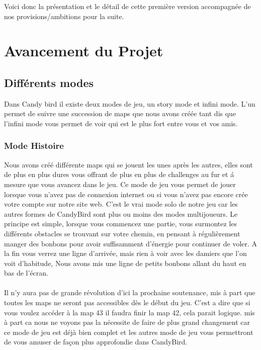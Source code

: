 \documentclass [11pt]{report}
\begin{document}
Voici donc la présentation et le détail de cette première version accompagnée de nos provisions/ambitions pour la suite.




\chapter{Avancement du Projet}
	\section{Différents modes}
	Dans Candy bird il existe deux modes de jeu, un story mode et infini mode. L'un permet de suivre une succession de maps que nous avons cr\'e\'ee tant dis que l'infini mode vous permet de voir qui est le plus fort entre vous et vos amis.
	
	\vspace{10mm}
	
		\subsection{Mode Histoire}	
		Nous avons créé différente maps qui se jouent les unes après les autres, elles sont de plus en plus dures vous  offrant de plus en plus de challenges au fur et \'a mesure que vous avancez dans le jeu. Ce mode de jeu vous permet de jouer lorsque vous n'avez pas de connexion internet ou si vous n'avez pas encore cr\'ee votre compte sur notre site web. C'est le vrai mode solo de notre jeu car les autres formes de CandyBird sont plus ou moins des modes multijoueurs. Le principe est simple, lorsque vous commencez une partie, vous surmontez les différents obstacles se trouvant sur votre chemin, en pensant \`a régulièrement manger des bonbons pour avoir suffisamment d'énergie pour continuer de voler. A la fin vous verrez une ligne d'arriv\'ee, mais rien \`a voir avec les damiers que l'on voit d'habitude, Nous avons mis une ligne de petits bonbons allant du haut en bas de l'écran.\\
		\\
		\indent
		Il n'y aura pas de grande révolution d'ici la prochaine soutenance, mis \`a part que toutes les maps ne seront pas accessibles d\`es le début du jeu. C'est a dire que si vous voulez accéder \`a la map 43 il faudra finir la map 42, cela parait logique. mis \`a part ca nous ne voyons pas la nécessite de faire de plus grand changement car ce mode de jeu est déjà bien complet et les autres mode de jeu vous permettront de vous amuser de façon plus approfondie dans CandyBird.
		
\end{document}
